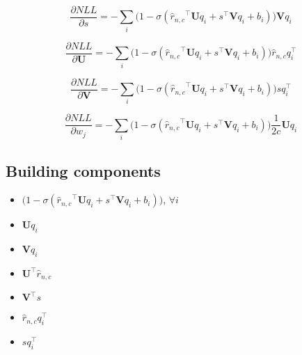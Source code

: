\documentclass[12pt]{article}
\newcommand{\trans}[1]{{#1}^{\top}}
\newcommand{\sigmoid}[1]{\sigma\left(#1\right)}
\newcommand{\ww}{\mathbf{U}}
\newcommand{\ws}{\mathbf{V}}
\begin{document}
\begin{equation}
  \frac{\partial NLL}{\partial s}=-\sum_i\Big(1-\sigmoid{\trans{\hat{r}_{n,c}}\ww q_i + \trans{s}\ws q_i + b_i}\Big)\ws q_i
\end{equation}

\begin{equation}
  \frac{\partial NLL}{\partial \ww}= -\sum_i\Big(1-\sigmoid{\trans{\hat{r}_{n,c}}\ww q_i + \trans{s}\ws q_i + b_i}\Big) \hat{r}_{n,c}\trans{q}_i
\end{equation}

\begin{equation}
  \frac{\partial NLL}{\partial \ws}= -\sum_i\Big(1-\sigmoid{\trans{\hat{r}_{n,c}}\ww q_i + \trans{s}\ws q_i + b_i}\Big) s\trans{q}_i
\end{equation}

\begin{equation}
  \frac{\partial NLL}{\partial w_j}= -\sum_i\Big(1-\sigmoid{\trans{\hat{r}_{n,c}}\ww q_i + \trans{s}\ws q_i + b_i}\Big) \frac{1}{2c}\ww q_i
\end{equation}

\subsection{Building components}
\begin{itemize}
\item $\Big(1-\sigmoid{\trans{\hat{r}_{n,c}}\ww q_i + \trans{s}\ws q_i + b_i}\Big)$, $\forall i$
\item $\ww q_i$
\item $\ws q_i$
\item $\trans{\ww}\hat{r}_{n,c}$
\item $\trans{\ws}s$
\item $\hat{r}_{n,c}\trans{q}_i$
\item $s\trans{q}_i$
\end{itemize}

\end{document}

